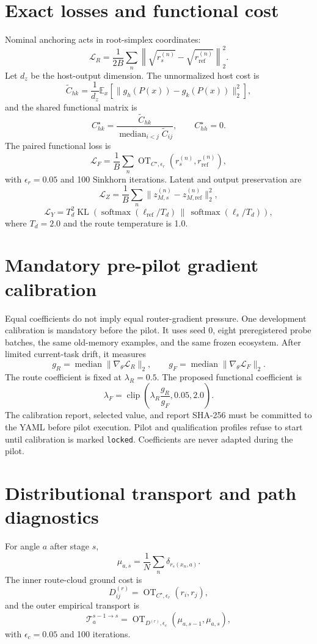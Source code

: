 \documentclass[11pt]{article}
\newcommand{\OT}{\operatorname{OT}}
\newcommand{\code}[1]{\texttt{#1}}
\begin{document}
\section{Exact losses and functional cost}
Nominal anchoring acts in root-simplex coordinates:
\[
\mathcal L_R=\frac{1}{2B}\sum_n\left\|\sqrt{r_s^{(n)}}-\sqrt{r_{\mathrm{ref}}^{(n)}}\right\|_2^2.
\]
Let $d_z$ be the host-output dimension. The unnormalized host cost is
\[
\widetilde C_{hk}=\frac{1}{d_z}\mathbb E_x\left[\|g_h(P(x))-g_k(P(x))\|_2^2\right],
\]
and the shared functional matrix is
\[
C^\star_{hk}=\frac{\widetilde C_{hk}}{\operatorname{median}_{i<j}\widetilde C_{ij}},\qquad C^\star_{hh}=0.
\]
The paired functional loss is
\[
\mathcal L_F=\frac1B\sum_n\OT_{C^\star,\epsilon_r}\left(r_s^{(n)},r_{\mathrm{ref}}^{(n)}\right),
\]
with $\epsilon_r=0.05$ and 100 Sinkhorn iterations. Latent and output preservation are
\[
\mathcal L_Z=\frac1B\sum_n\|z_{M,s}^{(n)}-z_{M,\mathrm{ref}}^{(n)}\|_2^2,
\]
\[
\mathcal L_Y=T_d^2\operatorname{KL}\!\left(\operatorname{softmax}(\ell_{\mathrm{ref}}/T_d)\,\|\,\operatorname{softmax}(\ell_s/T_d)\right),
\]
where $T_d=2.0$ and the route temperature is 1.0.

\section{Mandatory pre-pilot gradient calibration}
Equal coefficients do not imply equal router-gradient pressure. One development calibration is mandatory before the pilot. It uses seed 0, eight preregistered probe batches, the same old-memory examples, and the same frozen ecosystem. After limited current-task drift, it measures
\[
g_R=\operatorname{median}\|\nabla_\theta\mathcal L_R\|_2,\qquad g_F=\operatorname{median}\|\nabla_\theta\mathcal L_F\|_2.
\]
The route coefficient is fixed at $\lambda_R=0.5$. The proposed functional coefficient is
\[
\lambda_F=\operatorname{clip}\!\left(\lambda_R\frac{g_R}{g_F},0.05,2.0\right).
\]
The calibration report, selected value, and report SHA-256 must be committed to the YAML before pilot execution. Pilot and qualification profiles refuse to start until calibration is marked \code{locked}. Coefficients are never adapted during the pilot.

\section{Distributional transport and path diagnostics}
For angle $a$ after stage $s$,
\[
\mu_{a,s}=\frac1N\sum_n\delta_{r_s(x_n,a)}.
\]
The inner route-cloud ground cost is
\[
D^{(r)}_{ij}=\OT_{C^\star,\epsilon_r}(r_i,r_j),
\]
and the outer empirical transport is
\[
\mathcal T_a^{s-1\rightarrow s}=\OT_{D^{(r)},\epsilon_c}(\mu_{a,s-1},\mu_{a,s}),
\]
with $\epsilon_c=0.05$ and 100 iterations.
\end{document}
